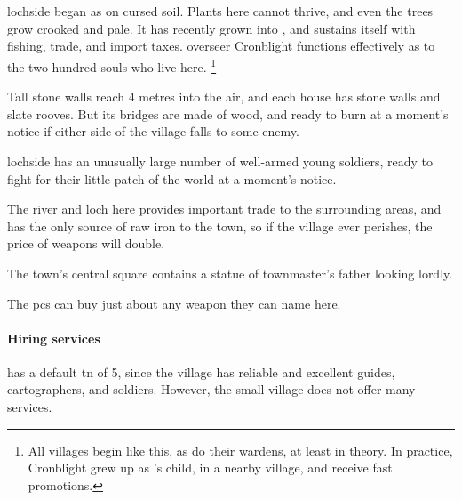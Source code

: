 

\section[\Glsfmttext{lochside}]{~~}
\label{lochside}

\begin{multicols}{2}

\begin{exampletext}
  \Gls{lochside} began as  on cursed soil.
  Plants here cannot thrive, and even the trees grow crooked and pale.
  It has recently grown into , and sustains itself with fishing, trade, and import taxes.
  \Gls{overseer} Cronblight functions effectively as  to the two-hundred souls who live here.%
  \footnote{All \glspl{village} begin like this, as do their \glspl{warden}, at least in theory.
  In practice, Cronblight grew up as 's child, in a nearby \gls{village}, and receive fast promotions.}
\end{exampletext}

Tall stone walls reach 4 metres into the air, and each house has stone walls and slate rooves.
But its bridges are made of wood, and ready to burn at a moment's notice if either side of the \gls{village} falls to some enemy.

\Gls{lochside} has an unusually large number of well-armed young soldiers, ready to fight for their little patch of the world at a moment's notice.

The river and loch here provides important trade to the surrounding areas, and has the only source of raw iron to the town, so if the \gls{village} ever perishes, the price of weapons will double.


The town's central square contains a statue of \gls{townmaster}'s father looking lordly.


The \glspl{pc} can buy just about any weapon they can name here.

\paragraph{Hiring services}
has a default \gls{tn} of 5, since the \gls{village} has reliable and excellent guides, cartographers, and soldiers.
However, the small \gls{village} does not offer many services.


\end{multicols}
